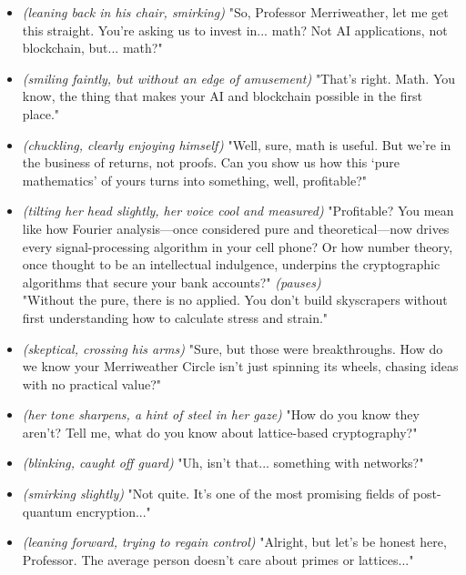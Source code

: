 \begin{itemize}[leftmargin=1.5cm]

\item[Investor \#1:] \textit{(leaning back in his chair, smirking)} "So, Professor Merriweather, let me get this straight. You’re asking us to invest in... math? Not AI applications, not blockchain, but... math?"

\item[Eleanor:] \textit{(smiling faintly, but without an edge of amusement)} "That’s right. Math. You know, the thing that makes your AI and blockchain possible in the first place."

\item[Investor \#2:] \textit{(chuckling, clearly enjoying himself)} "Well, sure, math is useful. But we’re in the business of returns, not proofs. Can you show us how this ‘pure mathematics’ of yours turns into something, well, profitable?"

\item[Eleanor:] \textit{(tilting her head slightly, her voice cool and measured)} "Profitable? You mean like how Fourier analysis—once considered pure and theoretical—now drives every signal-processing algorithm in your cell phone? Or how number theory, once thought to be an intellectual indulgence, underpins the cryptographic algorithms that secure your bank accounts?" \textit{(pauses)} \\ 
"Without the pure, there is no applied. You don’t build skyscrapers without first understanding how to calculate stress and strain."

\item[Investor \#3:] \textit{(skeptical, crossing his arms)} "Sure, but those were breakthroughs. How do we know your Merriweather Circle isn’t just spinning its wheels, chasing ideas with no practical value?"

\item[Eleanor:] \textit{(her tone sharpens, a hint of steel in her gaze)} "How do you know they aren’t? Tell me, what do you know about lattice-based cryptography?"

\item[Investor \#3:] \textit{(blinking, caught off guard)} "Uh, isn’t that... something with networks?"

\item[Eleanor:] \textit{(smirking slightly)} "Not quite. It’s one of the most promising fields of post-quantum encryption..."

\item[Investor \#1:] \textit{(leaning forward, trying to regain control)} "Alright, but let’s be honest here, Professor. The average person doesn’t care about primes or lattices..."


\end{itemize}
